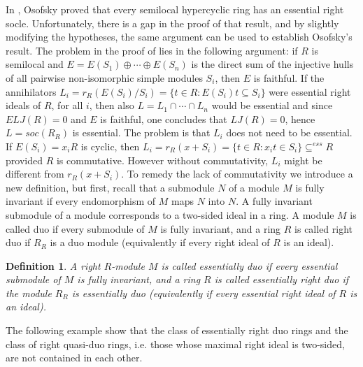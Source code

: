 \documentclass{amsart}
\theoremstyle{plain}
\newtheorem{definition}[theorem]{Definition}
\numberwithin{equation}{section}
\begin{document}
In \cite[Proposition 1.6]{O1},
Osofsky proved that every semilocal hypercyclic ring has an essential right socle. Unfortunately, there is a gap in the proof of that result, and by slightly
modifying the hypotheses, the same argument can be used to establish Osofsky's result. The problem in the proof of \cite[Proposition 1.6]{O1}
lies in the following argument: if $R$ is semilocal and $E =E (S_{1}) \oplus \cdots  \oplus E (S_{n})$ is the direct sum of the injective hulls of all pairwise non-isomorphic simple modules $S_{i}$, then $E$ is faithful. If the annihilators $L_{i} =r_{R} (E (S_{i})/S_{i}) =\{t \in R :E (S_{i}) t \subseteq S_{i}\}$ were essential right ideals of $R$, for all $i$, then also $L =L_{1} \cap \cdots  \cap L_{n}$ would be essential and since $E L J (R) =0$ and $E$ is faithful, one concludes that $L J (R) =0$, hence $L =s o c (R_{R})$ is essential. The problem is that $L_{i}$ does not need to be essential. If $E (S_{i}) =x_{i} R$ is cyclic, then $L_{i} =r_{R} (x +S_{i}) =\{t \in R :x_{i} t \in S_{i}\} \subseteq ^{e s s}R$ provided $R$ is commutative. However without commutativity, $L_{i}$ might be different from $r_{R} (x +S_{i})$. To remedy the lack of commutativity we introduce a new definition, but first, recall that a submodule $N$ of a module $M$ is fully invariant if every endomorphism of $M$ maps $N$ into $N$. A fully invariant submodule of a module corresponds to a two-sided ideal in a ring. A module $M$ is called duo if every submodule of $M$ is fully invariant, and a ring $R$ is called right duo if $R_{R}$ is a duo module (equivalently if every right ideal of $R$ is an ideal). 


\begin{definition}
A right $R$-module $M$ is called essentially duo if every essential submodule of $M$ is fully invariant, and a ring $R$ is called essentially right duo if the module $R_{R}$ is essentially duo (equivalently if every essential right ideal of $R$ is an ideal). 
\end{definition}

The following example show that the class of essentially right duo rings and the
class of right quasi-duo rings, i.e. those whose maximal right ideal is two-sided, are not contained in each other. 
\end{document}
